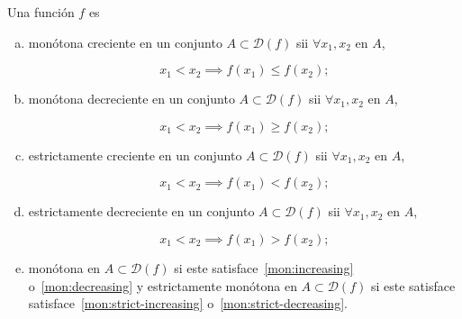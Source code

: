 \begin{frame}
  \begin{definition}
    Una función $f$ es
    \begin{enumerate}[(a)]
      \item\label{mon:increasing}

      \alert{monótona creciente} en un conjunto
      $A\subset\mathcal{D}\left(f\right)$ sii
      $\forall x_{1},x_{2}$ en $A$,

      \begin{equation*}
        x_{1}<
        x_{2}\implies
        f\left(x_{1}\right)\leq
        f\left(x_{2}\right);
      \end{equation*}

      \item\label{mon:decreasing}

      \alert{monótona decreciente} en un conjunto
      $A\subset\mathcal{D}\left(f\right)$ sii
      $\forall x_{1},x_{2}$ en $A$,

      \begin{equation*}
        x_{1}<
        x_{2}\implies
        f\left(x_{1}\right)\geq
        f\left(x_{2}\right);
      \end{equation*}

      \item\label{mon:strict-increasing}

      \alert{estrictamente creciente} en un conjunto
      $A\subset\mathcal{D}\left(f\right)$ sii
      $\forall x_{1},x_{2}$ en $A$,

      \begin{equation*}
        x_{1}<
        x_{2}\implies
        f\left(x_{1}\right)<
        f\left(x_{2}\right);
      \end{equation*}

      \item\label{mon:strict-decreasing}

      \alert{estrictamente decreciente} en un conjunto
      $A\subset\mathcal{D}\left(f\right)$ sii
      $\forall x_{1},x_{2}$ en $A$,

      \begin{equation*}
        x_{1}<
        x_{2}\implies
        f\left(x_{1}\right)>
        f\left(x_{2}\right);
      \end{equation*}

      \item

            \alert{monótona} en $A\subset\mathcal{D}\left(f\right)$
            si este satisface~\eqref{mon:increasing}
            o~\eqref{mon:decreasing}
            y \alert{estrictamente monótona} en
            $A\subset\mathcal{D}\left(f\right)$ si este satisface
            satisface~\eqref{mon:strict-increasing}
            o~\eqref{mon:strict-decreasing}.
    \end{enumerate}
  \end{definition}


\end{frame}
